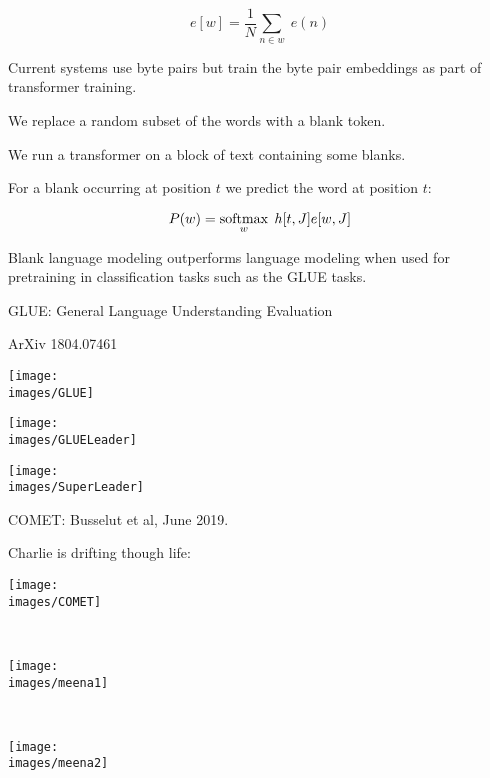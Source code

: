 {\vfill
$$e[w] = \frac{1}{N} \sum_{n \in w}\; e(n)$$

\vfill
Current systems use byte pairs but train the byte pair embeddings as part of transformer training.



We replace a random subset of the words with a blank token.

\vfill
We run a transformer on a block of text containing some blanks.

\vfill
For a blank occurring at position $t$ we predict the word at position $t$:

\vfill
$$P(w) = \operatorname*{softmax}_w\;h[t,J]e[w,J]$$

\vfill
Blank language modeling outperforms language modeling when used for pretraining in classification tasks such as the GLUE tasks.



GLUE: General Language Understanding Evaluation

\vfill

\centerline{\normalsize ArXiv 1804.07461}
\centerline{\texttt{[image: \\images/GLUE]}}


\centerline{\texttt{[image: \\images/GLUELeader]}}


\centerline{\texttt{[image: \\images/SuperLeader]}}


COMET: Busselut et al, June 2019.

\vfill
Charlie is drifting though life:

\centerline{\texttt{[image: \\images/COMET]}}\


\centerline{\texttt{[image: \\images/meena1]}}\


\centerline{\texttt{[image: \\images/meena2]}}\



}

